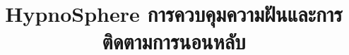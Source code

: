 \documentclass[conference]{IEEEtran}
\begin{document}
\title{\englishfont HypnoSphere \thaifont การควบคุมความฝันและการติดตามการนอนหลับ}
\maketitle
\end{document}
